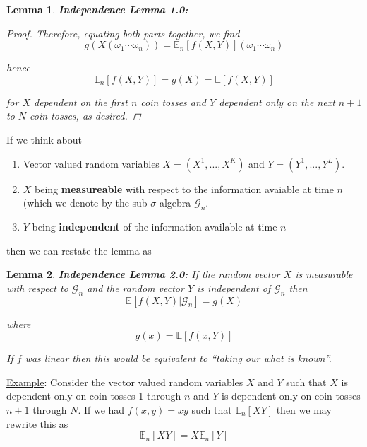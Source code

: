 \documentclass[12pt]{article}
\newtheorem{lemma}{Lemma}
\newcommand{\E}{\mathbb E}
\begin{document}
\begin{lemma} {\bf Independence Lemma 1.0:}
\begin{proof}
Therefore, equating both parts together, we find
\begin{equation*}
	g(X(\omega_1\cdots\omega_n)) = \E_n \left[ f(X, Y) \right](\omega_1\cdots\omega_n)
\end{equation*}

hence
\begin{equation*}
	\E_n[f(X,Y)] = g(X) = \E[f(X,Y)]
\end{equation*}

for $X$ dependent on the first $n$ coin tosses and $Y$ dependent only on the next $n + 1$ to $N$ coin tosses, as desired.
\end{proof}
\end{lemma}

If we think about
\begin{enumerate}
	\item Vector valued random variables $X = (X^1,...,X^K)$ and $Y = (Y^1,...,Y^L)$.
	\item $X$ being {\bf measureable} with respect to the information avaiable at time $n$ (which we denote by the sub-$\sigma$-algebra $\mathcal G_n$.
	\item $Y$ being {\bf independent} of the information available at time $n$ 
\end{enumerate}

then we can restate the lemma as

\begin{lemma} {\bf Independence Lemma 2.0:} If the random vector $X$ is measurable with respect to $\mathcal G_n$ and the random vector $Y$ is independent of $\mathcal G_n$ then
\begin{equation*}
	\E \left[ f ( X,Y ) \Big| \mathcal G_n \right] = g(X)
\end{equation*}

where 
\begin{equation*}
	g(x) = \E \left[ f(x, Y ) \right]
\end{equation*}

If $f$ was linear then this would be equivalent to ``taking our what is known''.
\end{lemma}

\underline{Example}: Consider the vector valued random variables $X$ and $Y$ such that $X$ is dependent only on coin tosses 1 through $n$ and $Y$ is dependent only on coin tosses $n + 1$ through $N$. If we had $f(x,y) = xy$ such that $\E_n[XY]$ then we may rewrite this as
\begin{equation*}
	\E_n[XY] = X\E_n[Y]
\end{equation*}
\end{document}
